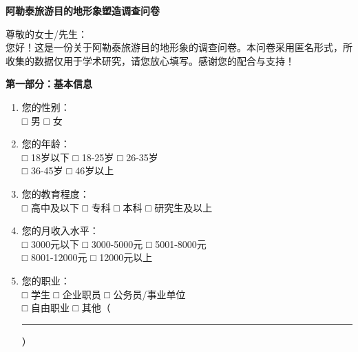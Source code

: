 \documentclass[10pt]{article}
\newcommand{\fillline}{\rule{2.5cm}{0.4pt}}
\begin{document}
\begin{CJK*}{UTF8}{gbsn}

\begin{center}
\Large\textbf{阿勒泰旅游目的地形象塑造调查问卷}
\end{center}

\vspace{0.5cm}
\noindent 尊敬的女士/先生：\\
您好！这是一份关于阿勒泰旅游目的地形象的调查问卷。本问卷采用匿名形式，所收集的数据仅用于学术研究，请您放心填写。感谢您的配合与支持！

\vspace{0.8cm}
\textbf{第一部分：基本信息}

\begin{enumerate}[label=\arabic*., itemsep=0.8cm]
\item 您的性别：\\
\hspace{1cm}□ 男 \hspace{3cm} □ 女

\item 您的年龄：\\
\hspace{1cm}□ 18岁以下 \hspace{2cm} □ 18-25岁 \hspace{2cm} □ 26-35岁\\
\hspace{1cm}□ 36-45岁 \hspace{2cm} □ 46岁以上

\item 您的教育程度：\\
\hspace{1cm}□ 高中及以下 \hspace{2cm} □ 专科 \hspace{2cm} □ 本科 \hspace{2cm} □ 研究生及以上

\item 您的月收入水平：\\
\hspace{1cm}□ 3000元以下 \hspace{2cm} □ 3000-5000元 \hspace{2cm} □ 5001-8000元\\
\hspace{1cm}□ 8001-12000元 \hspace{2cm} □ 12000元以上

\item 您的职业：\\
\hspace{1cm}□ 学生 \hspace{2cm} □ 企业职员 \hspace{2cm} □ 公务员/事业单位\\
\hspace{1cm}□ 自由职业 \hspace{2cm} □ 其他（\fillline）
\end{enumerate}


\end{CJK*}
\end{document}

